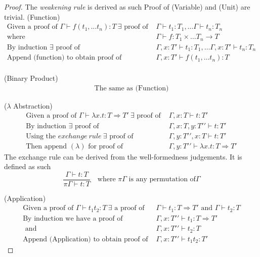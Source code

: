 \documentclass{article}
\theoremstyle{definition}
\begin{document}
\begin{proof}
    The \textit{weakening rule} is derived as such
    Proof of (Variable) and (Unit) are trivial.
    (Function)
    \begin{align*}
         \textrm{Given a proof of }\Gamma \vdash f(t_1,\dots t_n) : T\ \exists \textrm{ proof of }
         &\Gamma \vdash t_1 : T_1, \dots \Gamma \vdash t_n : T_n \\
         \textrm{where }
         &\Gamma \vdash f : T_1 \times \dots T_n \rightarrow T \\
         \textrm{By induction } \exists \textrm{ proof of }
         &\Gamma, x : T\prime \vdash t_1 : T_1, \dots \Gamma, x : T\prime \vdash t_n : T_n\\
         \textrm{Append (function) to obtain proof of }
         &\Gamma, x : T\prime \vdash f(t_1, \dots t_n) : T\\
    \end{align*}

    (Binary Product)
    \begin{align*}
        \textrm{The same as (Function)}
    \end{align*}

    ($\lambda$ Abstraction)
    \begin{align*}
         \textrm{Given a proof of }\Gamma \vdash \lambda x.t : T \Rightarrow T\prime\ \exists \textrm{ proof of }
        &\Gamma, x : T \vdash t : T\prime \\
         \textrm{By induction } \exists \textrm{ proof of }
        &\Gamma, x : T, y : T\prime\prime \vdash t : T\prime \\
         \textrm{Using the }\mathit{exchange\ rule\ } \exists \textrm{ proof of }
        &\Gamma, y : T\prime\prime, x : T \vdash  t : T\prime \\
         \textrm{Then append }(\lambda)\textrm{ for proof of }
        &\Gamma, y : T\prime\prime \vdash \lambda x.t : T \Rightarrow T\prime
    \end{align*}
    The exchange rule can be derived from the well-formedness judgements.
    It is defined as such
    $$
    \frac
    {\Gamma \vdash t : T}
    {\pi\Gamma \vdash t : T}
    \quad
    \textrm{where }
    \pi \Gamma
    \textrm{ is any permutation of}
    \Gamma
    $$

    (Application)
    \begin{align*}
        \textrm{Given a proof of } \Gamma \vdash t_1 t_2 : T\ \exists \textrm{ a proof of }
        &\Gamma \vdash t_1 : T \Rightarrow T\prime \textrm{ and } \Gamma \vdash t_2 : T\\
        \textrm{By induction we have a proof of }
        &\Gamma, x : T\prime\prime \vdash t_1 : T \Rightarrow T\prime \\
        \textrm{ and }
        &\Gamma, x : T\prime\prime \vdash t_2 : T \\
        \textrm{Append (Application) to obtain proof of }
        &\Gamma, x : T\prime\prime \vdash t_1 t_2 : T\prime
    \end{align*}
\end{proof}
\end{document}

